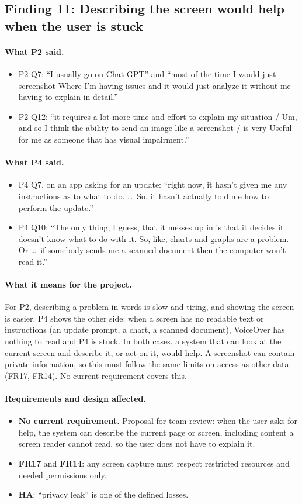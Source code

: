 \documentclass[12pt, titlepage]{article}
\newcommand{\saidtwo}{\paragraph{What P2 said.}}
\newcommand{\saidfour}{\paragraph{What P4 said.}}
\newcommand{\means}{\paragraph{What it means for the project.}}
\newcommand{\affects}{\paragraph{Requirements and design affected.}}
\begin{document}
\subsection{Finding 11: Describing the screen would help when the user is stuck}

\saidtwo
\begin{itemize}
    \item P2 Q7: ``I usually go on Chat GPT'' and ``most of the time I would just screenshot Where I'm having issues and it would just analyze it without me having to explain in detail.''
    \item P2 Q12: ``it requires a lot more time and effort to explain my situation / Um, and so I think the ability to send an image like a screenshot / is very Useful for me as someone that has visual impairment.''
\end{itemize}

\saidfour
\begin{itemize}
    \item P4 Q7, on an app asking for an update: ``right now, it hasn't given me any instructions as to what to do. \ldots\ So, it hasn't actually told me how to perform the update.''
    \item P4 Q10: ``The only thing, I guess, that it messes up in is that it decides it doesn't know what to do with it. So, like, charts and graphs are a problem. Or \ldots\ if somebody sends me a scanned document then the computer won't read it.''
\end{itemize}

\means
For P2, describing a problem in words is slow and tiring, and showing the screen is easier. P4 shows the other side: when a screen has no readable text or instructions (an update prompt, a chart, a scanned document), VoiceOver has nothing to read and P4 is stuck. In both cases, a system that can look at the current screen and describe it, or act on it, would help. A screenshot can contain private information, so this must follow the same limits on access as other data (FR17, FR14). No current requirement covers this.

\affects
\begin{itemize}
    \item \textbf{No current requirement.} Proposal for team review: when the user asks for help, the system can describe the current page or screen, including content a screen reader cannot read, so the user does not have to explain it.
    \item \textbf{FR17} and \textbf{FR14}: any screen capture must respect restricted resources and needed permissions only.
    \item \textbf{HA}: ``privacy leak'' is one of the defined losses.
\end{itemize}
\end{document}
